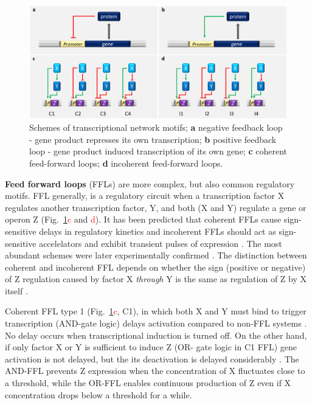\begin{figure}[ht!]
  \centering
  \includegraphics[scale=0.29]{text/Pictures/TxnMotifs.png}
	\caption{Schemes of transcriptional network motifs; \textbf{a} negative feedback loop - gene product represses its own transcription; \textbf{b} positive feedback loop - gene product induced transcription of its own gene; \textbf{c} coherent feed-forward loops; \textbf{d} incoherent feed-forward loops.}
	\label{motifs}
\end{figure}

\textbf{Feed forward loops} (FFLs) are more complex, but also common regulatory motifs.
FFL generally, is a regulatory circuit when a transcription factor X regulates another transcription factor, Y, and both (X and Y) regulate a gene or operon Z (Fig.~\ref{motifs}\textcolor{red}{c} and \textcolor{red}{d}).
It has been predicted that coherent FFLs cause sign-sensitive delays in regulatory kinetics and incoherent FFLs should act as sign-sensitive accelelators and exhibit transient pulses of expression \cite{mangan2003structure}.
The most abundant schemes were later experimentally confirmed \cite{mangan2003coherent, kalir2005coherent, mangan2006incoherent}.
The distinction between coherent and incoherent FFL depends on whether the sign (positive or negative) of Z regulation caused by factor X \textit{through} Y is the same as regulation of Z by X itself \cite{shen2002network, mangan2003structure}.

Coherent FFL type 1 (Fig.~\ref{motifs}\textcolor{red}{c}, C1), in which both X and Y must bind to trigger transcription (AND-gate logic) delays activation compared to non-FFL systems \cite{mangan2003coherent}.
No delay occurs when transcriptional induction is turned off.
On the other hand, if only factor X or Y is sufficient to induce Z (OR- gate logic in C1 FFL) gene activation is not delayed, but the its deactivation is delayed considerably \cite{kalir2005coherent}.
The AND-FFL prevents Z expression when the concentration of X fluctuates close to a threshold, while the OR-FFL enables continuous production of Z even if X concentration drops below a threshold for a while.

